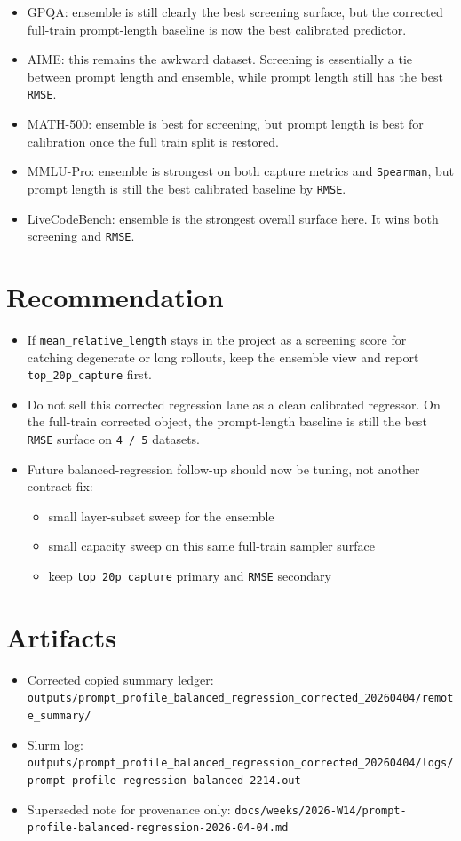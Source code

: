 \documentclass[11pt]{article}
\begin{document}
\begin{itemize}
\item GPQA: ensemble is still clearly the best screening surface, but the corrected full-train prompt-length baseline is now the best calibrated predictor.
\item AIME: this remains the awkward dataset. Screening is essentially a tie between prompt length and ensemble, while prompt length still has the best \texttt{RMSE}.
\item MATH-500: ensemble is best for screening, but prompt length is best for calibration once the full train split is restored.
\item MMLU-Pro: ensemble is strongest on both capture metrics and \texttt{Spearman}, but prompt length is still the best calibrated baseline by \texttt{RMSE}.
\item LiveCodeBench: ensemble is the strongest overall surface here. It wins both screening and \texttt{RMSE}.
\end{itemize}

\section{Recommendation}

\begin{itemize}
\item If \texttt{mean\_relative\_length} stays in the project as a screening score for catching degenerate or long rollouts, keep the ensemble view and report \texttt{top\_20p\_capture} first.
\item Do not sell this corrected regression lane as a clean calibrated regressor. On the full-train corrected object, the prompt-length baseline is still the best \texttt{RMSE} surface on \texttt{4 / 5} datasets.
\item Future balanced-regression follow-up should now be tuning, not another contract fix:
  \begin{itemize}
  \item small layer-subset sweep for the ensemble
  \item small capacity sweep on this same full-train sampler surface
  \item keep \texttt{top\_20p\_capture} primary and \texttt{RMSE} secondary
  \end{itemize}
\end{itemize}

\section{Artifacts}

\begin{itemize}
\item Corrected copied summary ledger: \texttt{outputs/prompt\_profile\_balanced\_regression\_corrected\_20260404/remote\_summary/}
\item Slurm log: \texttt{outputs/prompt\_profile\_balanced\_regression\_corrected\_20260404/logs/prompt-profile-regression-balanced-2214.out}
\item Superseded note for provenance only: \texttt{docs/weeks/2026-W14/prompt-profile-balanced-regression-2026-04-04.md}
\end{itemize}
\end{document}
